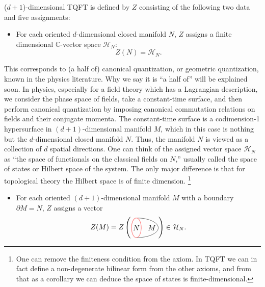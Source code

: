 ($d+1$)-dimensional TQFT is defined by $Z$ consisting of the following
two data and five assignments:
\begin{itemize}
  \item For each oriented $d$-dimensional closed manifold $N$, $Z$ assigns a
finite dimensional $\mathbb{C}$-vector space $\mathcal{H}_{N}$:
\begin{equation}
  Z(N)  =  \mathcal{H}_{N}.
\end{equation}
\end{itemize}
This corresponds to (a half of) canonical quantization, or geometric
quantization, known in the physics literature. Why we say it is ``a half
of'' will be explained soon. In physics, especially for a
field theory which has a Lagrangian description, we consider the phase
space of fields, take a constant-time surface, and then perform canonical
quantization by imposing canonical commutation relations on fields
and their conjugate momenta. The constant-time surface is a codimension-1
hypersurface in $(d+1)$-dimensional manifold $M$, which in this
case is nothing but the $d$-dimensional closed manifold $N$. Thus,
the manifold $N$ is viewed as a collection of $d$ spatial directions.
One can think of the assigned vector space $\mathcal{H}_{N}$ as ``the
space of functionals on the classical fields on $N$,'' usually called
the space of states or Hilbert space of the system. The only
major difference is that for topological theory the Hilbert space
is of finite dimension.%
%
\footnote{One can remove the finiteness condition from the axiom. In
TQFT we can in fact define a non-degenerate bilinear form from the other axioms,
and from that as a corollary we can deduce the space of states is
finite-dimensional. }
%
\begin{itemize}
  \item For each oriented $(d+1)$-dimensional manifold $M$ with a boundary
$\partial M=N$, $Z$ assigns a vector
\begin{equation}
  Z(M)
  =
  Z\left(
    \begin{tikzpicture}[scale=0.6, baseline=(x.base)]    \node (x) at (0,0) {\vphantom{x}};
        \def\bdyradius{0.8cm}

        \draw (0,-\bdyradius) arc[start angle=-90,end angle=90,x radius=1.8cm,y radius=\bdyradius] node[left=0.1,pos=0.5] {$M$};
        \draw[thick, red!50] (0,0) node[black] {$N$} circle[x radius=0.4cm,y radius=\bdyradius];

    \end{tikzpicture}
  \right)
  \in  \mathcal{H}_{N}.
\end{equation}
\end{itemize}
